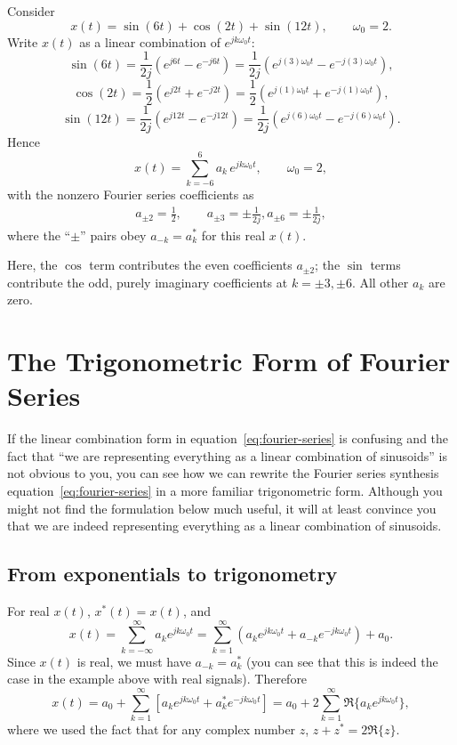 \documentclass{ee102_notes}
\begin{document}
Consider
\[
x(t)=\sin(6t)+\cos(2t)+\sin(12t),\qquad \omega_0=2.
\]
Write $x(t)$ as a linear combination of $e^{jk\omega_0 t}$:
\[
\sin(6t)=\frac{1}{2j}\!\left(e^{j6t}-e^{-j6t}\right)
= \frac{1}{2j}\!\left(e^{j(3)\omega_0 t}-e^{-j(3)\omega_0 t}\right),
\]
\[
\cos(2t)=\frac{1}{2}\!\left(e^{j2t}+e^{-j2t}\right)
=\frac{1}{2}\!\left(e^{j(1)\omega_0 t}+e^{-j(1)\omega_0 t}\right),
\]
\[
\sin(12t)=\frac{1}{2j}\!\left(e^{j12t}-e^{-j12t}\right)
= \frac{1}{2j}\!\left(e^{j(6)\omega_0 t}-e^{-j(6)\omega_0 t}\right).
\]
Hence
\[
x(t)=\sum_{k=-6}^{6} a_k\,e^{jk\omega_0 t},\qquad \omega_0=2,
\]
with the nonzero Fourier series coefficients as
\[
\begin{aligned}
a_{\pm 2}=\frac{1}{2},\qquad a_{\pm 3}=\pm \frac{1}{2j},a_{\pm 6}=\pm \frac{1}{2j},
\end{aligned}
\]
where the ``$\pm$'' pairs obey $a_{-k}=a_k^\ast$ for this real $x(t)$. 

Here, the $\cos$ term contributes the even coefficients $a_{\pm2}$; the $\sin$ terms contribute the odd, purely imaginary coefficients at $k=\pm3,\pm6$. All other $a_k$ are zero.

\section{The Trigonometric Form of Fourier Series}
If the linear combination form in equation~\eqref{eq:fourier-series} is confusing and the fact that ``we are representing everything as a linear combination of sinusoids'' is not obvious to you, you can see how we can rewrite the Fourier series synthesis equation~\eqref{eq:fourier-series} in a more familiar trigonometric form. Although you might not find the formulation below much useful, it will at least convince you that we are indeed representing everything as a linear combination of sinusoids.
\subsection{From exponentials to trigonometry}

For real $x(t)$, $x^\ast(t)=x(t)$, and
\[
x(t)=\sum_{k=-\infty}^{\infty} a_k e^{jk\omega_0 t}
=\sum_{k=1}^{\infty}\!\left( a_k e^{jk\omega_0 t}+a_{-k} e^{-jk\omega_0 t}\right)+a_0.
\]
Since $x(t)$ is real, we must have $a_{-k}=a_k^\ast$ (you can see that this is indeed the case in the example above with real signals). Therefore
\[
x(t)=a_0+\sum_{k=1}^{\infty}\!\left[a_k e^{jk\omega_0 t}+a_k^\ast e^{-jk\omega_0 t}\right]
= a_0+ 2\sum_{k=1}^{\infty} \Re\!\big\{a_k e^{jk\omega_0 t}\big\},
\]
where we used the fact that for any complex number $z$, $z+z^\ast=2\Re\{z\}$.
\end{document}
